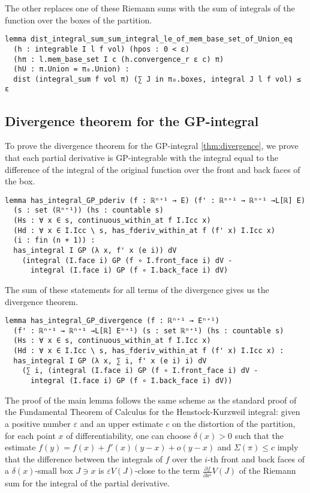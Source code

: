 \documentclass[a4paper, UKenglish,cleveref, autoref, thm-restate]{lipics-v2021}
\newcommand{\eps}{\varepsilon}
\begin{document}
The other replaces one of these Riemann sums with the sum of integrals
of the function over the boxes of the partition.

\begin{lstlisting}
lemma dist_integral_sum_sum_integral_le_of_mem_base_set_of_Union_eq
  (h : integrable I l f vol) (hpos : 0 < ε)
  (hπ : l.mem_base_set I c (h.convergence_r ε c) π)
  (hU : π.Union = π₀.Union) :
  dist (integral_sum f vol π) (∑ J in π₀.boxes, integral J l f vol) ≤ ε
\end{lstlisting}

\subsection{Divergence theorem for the GP-integral}%
\label{sec:diverg-theor-gp}

To prove the divergence theorem for the GP-integral
\autoref{thm:divergence}, we prove that each partial derivative is
GP-integrable with the integral equal to the difference of the
integral of the original function over the front and back faces of the
box.

\begin{lstlisting}
lemma has_integral_GP_pderiv (f : ℝⁿ⁺¹ → E) (f' : ℝⁿ⁺¹ → ℝⁿ⁺¹ →L[ℝ] E)
  (s : set (ℝⁿ⁺¹)) (hs : countable s)
  (Hs : ∀ x ∈ s, continuous_within_at f I.Icc x)
  (Hd : ∀ x ∈ I.Icc \ s, has_fderiv_within_at f (f' x) I.Icc x)
  (i : fin (n + 1)) :
  has_integral I GP (λ x, f' x (e i)) dV
    (integral (I.face i) GP (f ∘ I.front_face i) dV -
      integral (I.face i) GP (f ∘ I.back_face i) dV)
\end{lstlisting}

The sum of these statements for all terms of the divergence gives us
the divergence theorem.

\begin{lstlisting}[caption={The divergence theorem for the GP-integral},label=lst:divergence-GP]
lemma has_integral_GP_divergence (f : ℝⁿ⁺¹ → Eⁿ⁺¹)
  (f' : ℝⁿ⁺¹ → ℝⁿ⁺¹ →L[ℝ] Eⁿ⁺¹) (s : set ℝⁿ⁺¹) (hs : countable s)
  (Hs : ∀ x ∈ s, continuous_within_at f I.Icc x)
  (Hd : ∀ x ∈ I.Icc \ s, has_fderiv_within_at f (f' x) I.Icc x) :
  has_integral I GP (λ x, ∑ i, f' x (e i) i) dV
    (∑ i, (integral (I.face i) GP (f ∘ I.front_face i) dV -
      integral (I.face i) GP (f ∘ I.back_face i) dV))
\end{lstlisting}

The proof of the main lemma follows the same scheme as the standard
proof of the Fundamental Theorem of Calculus for the Henstock-Kurzweil
integral: given a positive number \(\eps\) and an upper estimate \(c\)
on the distortion of the partition, for each point \(x\) of
differentiability, one can choose \(\delta(x)>0\) such that the
estimate \(f(y)=f(x)+f'(x)(y-x)+o(y-x)\) and \(\Sigma(\pi)\le c\)
imply that the difference between the integrals of
\(f\) over the \(i\)-th front and back faces of a \(\delta(x)\)-small
box \(J\ni x\) is \(\eps V(J)\)-close to the term
\(\frac{\partial f}{\partial x^{i}}V(J)\) of the Riemann sum for the
integral of the partial derivative.
\end{document}
